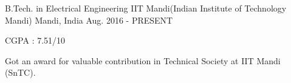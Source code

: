 


\begin{cventries}


\cventry
{B.Tech. in Electrical Engineering} %
{IIT Mandi(Indian Institute of Technology Mandi)} %
{Mandi, India} %
{Aug. 2016 - PRESENT} %
{ %
\begin{cvitems}
\item {CGPA : 7.51/10}
\item {Got an award for valuable contribution in Technical Society at IIT Mandi (SnTC).}
\end{cvitems}
}


\end{cventries}